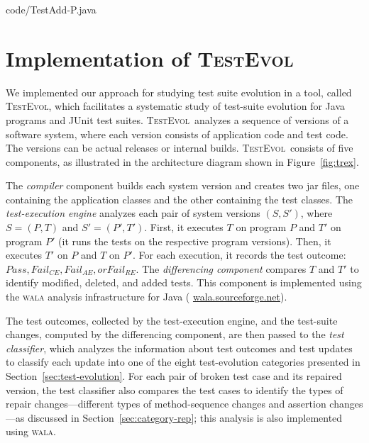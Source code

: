 \documentclass[conference]{IEEEtran}
\newcommand{\mt}{\mathit}
\newcommand{\pass}{\mt{Pass}}
\newcommand{\failce}{\mt{Fail}_{CE}}
\newcommand{\failre}{\mt{Fail}_{RE}}
\newcommand{\failae}{\mt{Fail}_{AE}}
\newcommand{\tool}{\textsc{TestEvol}\xspace}
\begin{document}

{code/TestAdd-P.java}

\section{Implementation of \tool}
\label{sec:implementation}




We implemented our approach for studying test suite evolution in a
tool, called \tool, which facilitates a systematic study of test-suite
evolution for Java programs and JUnit test suites.  \tool\ analyzes a
sequence of versions of a software system, where each version consists
of application code and test code. The versions can be actual releases
or internal builds.  \tool\ consists of five components, as
illustrated in the architecture diagram shown in
Figure~\ref{fig:trex}.

The \emph{compiler} component builds each system version and creates
two jar files, one containing the application classes and the other
containing the test classes.
%
The \emph{test-execution engine} analyzes each pair of system versions
$(S, S')$, where $S = (P, T)$ and $S' = (P', T')$.  First, it executes
$T$ on program $P$ and $T'$ on program $P'$ (\ie it runs the tests on
the respective program versions).  Then, it executes $T'$ on $P$ and
$T$ on $P'$. For each execution, it records the test outcome: $\pass,
\failce, \failae, or \failre$.
%
The \emph{differencing component} compares $T$ and $T'$ to identify
modified, deleted, and added tests. This component is implemented
using the \textsc{wala} analysis infrastructure for Java ({\small
  \url{wala.sourceforge.net}}).

The test outcomes, collected by the test-execution engine, and the
test-suite changes, computed by the differencing component, are then
passed to the \emph{test classifier}, which analyzes the information
about test outcomes and test updates to classify each update into one
of the eight test-evolution categories presented in
Section~\ref{sec:test-evolution}.  For each pair of broken test case
and its repaired version, the test classifier also compares the test
cases to identify the types of repair changes---different types of
method-sequence changes and assertion changes---as discussed in
Section~\ref{sec:category-rep}; this analysis is also implemented
using \textsc{wala}.
\end{document}
